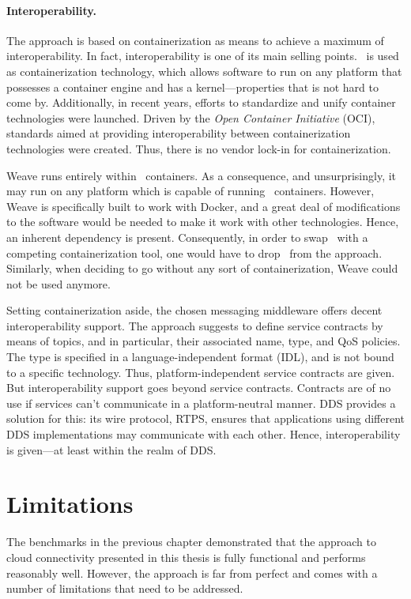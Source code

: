 \paragraph{Interoperability.}
The approach is based on containerization as means to achieve a maximum of interoperability. In fact, interoperability is one of its main selling points. \docker\ is used as containerization technology, which allows software to run on any platform that possesses a container engine and has a kernel---properties that is not hard to come by. Additionally, in recent years, efforts to standardize and unify container technologies were launched. Driven by the \emph{Open Container Initiative} (OCI), standards aimed at providing interoperability between containerization technologies were created. Thus, there is no vendor lock-in for containerization.

Weave runs entirely within \docker\ containers. As a consequence, and unsurprisingly, it may run on any platform which is capable of running \docker\ containers. However, Weave is specifically built to work with Docker, and a great deal of modifications to the software would be needed to make it work with other technologies. Hence, an inherent dependency is present. Consequently, in order to swap \docker\ with a competing containerization tool, one would have to drop \wnet\ from the approach. Similarly, when deciding to go without any sort of containerization, Weave could not be used anymore.

Setting containerization aside, the chosen messaging middleware offers decent interoperability support. The approach suggests to define service contracts by means of topics, and in particular, their associated name, type, and QoS policies. The type is specified in a language-independent format (IDL), and is not bound to a specific technology. Thus, platform-independent service contracts are given. But interoperability support goes beyond service contracts. Contracts are of no use if services can't communicate in a platform-neutral manner. DDS provides a solution for this: its wire protocol, RTPS, ensures that applications using different DDS implementations may communicate with each other. Hence, interoperability is given---at least within the realm of DDS. 



\section{Limitations}

The benchmarks in the previous chapter demonstrated that the approach to cloud connectivity presented in this thesis is fully functional and performs reasonably well. However, the approach is far from perfect and comes with a number of limitations that need to be addressed.

